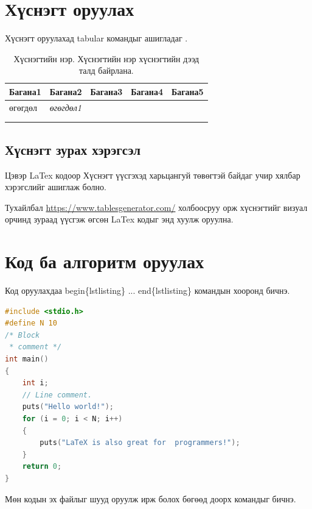 \documentclass[12pt,A4]{report}
\begin{document}
\chapter{Хүснэгт оруулах}
Хүснэгт оруулахад tabular командыг ашигладаг \cite{table}.

\begin{table}[h]
	\centering
	\caption{Хүснэгтийн нэр. Хүснэгтийн нэр хүснэгтийн дээд талд байрлана. }
	\label{my-label}
	\begin{tabular}{|l|l|l|l|l|}
		\hline
		\textbf{Багана1} & \textbf{Багана2}  & \textbf{Багана3} & \textbf{Багана4} & \textbf{Багана5} \\ \hline
		өгөгдөл          & \textit{өгөгдөл1} &                  &                  &                  \\ \hline
		                 &                   &                  &                  &                  \\ \hline
		                 &                   &                  &                  &                  \\ \hline
	\end{tabular}
\end{table}

\section{Хүснэгт зурах хэрэгсэл}
Цэвэр LaTex кодоор Хүснэгт үүсгэхэд харьцангуй төвөгтэй байдаг учир
хялбар хэрэгслийг ашиглаж болно.

Тухайлбал \url{https://www.tablesgenerator.com/} холбоосруу орж хүснэгтийг визуал орчинд зураад үүсгэж өгсөн LaTex кодыг энд хуулж оруулна.

\chapter{Код ба алгоритм оруулах}
Код оруулахдаа begin\{lstlisting\}  ... end\{lstlisting\} командын хооронд бичнэ.

\begin{lstlisting}[language=C, caption=С хэлний кодын жишээ, frame=single]
#include <stdio.h>
#define N 10
/* Block
 * comment */
int main()
{
    int i;
    // Line comment.
    puts("Hello world!");
    for (i = 0; i < N; i++)
    {
        puts("LaTeX is also great for  programmers!");
    }
    return 0;
}
\end{lstlisting}

Мөн кодын эх файлыг шууд оруулж ирж болох бөгөөд доорх командыг бичнэ.
\end{document}
